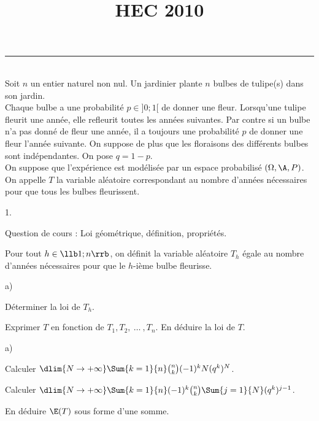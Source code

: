 \documentclass[11pt]{article}%
\title{\bf \vspace{-1.6cm} HEC 2010} %
\author{} %
\date{} %
\begin{document}
\maketitle %
\vspace{-1.2cm}\hrule %
\thispagestyle{fancy}

\vspace*{.2cm}


\begin{exerciceAP}~\\
  Soit $n$ un entier naturel non nul. Un jardinier plante $n$ bulbes
  de tulipe(s) dans son jardin.\\
  Chaque bulbe a une probabilité $p \in ]0 ; 1[$ de donner une
  fleur. Lorsqu'une tulipe fleurit une année, elle refleurit toutes
  les années suivantes. Par contre si un bulbe n'a pas donné de fleur
  une année, il a toujours une probabilité $p$ de donner une fleur
  l'année suivante. On suppose de plus que les floraisons des
  différents bulbes sont indépendantes. On pose $q = 1-p$.
  \\[.2cm]
  On suppose que l'expérience est modélisée par un espace probabilisé
  $(\Omega , \A , P)$. \\
  On appelle $T$ la variable aléatoire correspondant au nombre
  d'années nécessaires pour que tous les bulbes fleurissent.
  \begin{noliste}{1.}
    \setlength{\itemsep}{2mm}
  \item Question de cours : Loi géométrique, définition, propriétés.
  \item Pour tout $h \in \llb 1 ; n \rrb$, on définit la variable
    aléatoire $T_h$ égale au nombre d'années nécessaires pour que le
    $h$-ième bulbe fleurisse. 
    \begin{noliste}{a)}
    \setlength{\itemsep}{2mm}
    \item Déterminer la loi de $T_h$.
    \item Exprimer $T$ en fonction de $T_1, T_2 ,\ \dots\ , T_n$. En
      déduire la loi de $T$.
    \end{noliste}
  \item \begin{noliste}{a)}
    \setlength{\itemsep}{2mm} 
    \item Calculer $\dlim{N \rightarrow +\infty} \Sum{k=1}{n}
      \binom{n}{k} (-1)^k N (q^k)^N$.
    \item Calculer $\dlim{N \rightarrow +\infty} \Sum{k=1}{n} (-1)^k
      \binom{n}{k} \Sum{j=1}{N} (q^k)^{j-1}$.
    \item En déduire $\E(T)$ sous forme d'une somme.
    \end{noliste}
  \end{noliste}
\end{exerciceAP}
\end{document}

